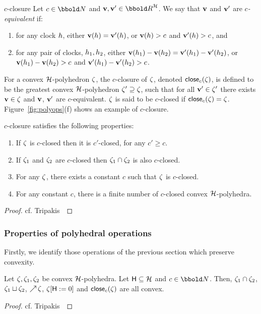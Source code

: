 {\begin{paragraph}{$c$-closure}
Let $c \in \nat$ and $\clkvl,\clkvl' \in \clkvls$. We say that
$\mathbf{v}$ and $\mathbf{v}'$ are \emph{$c$-equivalent} if:
\begin{enumerate}
\item for any clock $h$, either $\mathbf{v}(h) = \mathbf{v}'(h)$,
  or $\mathbf{v}(h) > c$ and $\mathbf{v}'(h) > c$, and
\item for any pair of clocks, $h_1, h_2$, either
  $\mathbf{v}(h_1) - \mathbf{v}(h_2) = \mathbf{v}'(h_1) - \mathbf{v}'(h_2)$, or $\mathbf{v}(h_1) - \mathbf{v}(h_2) > c$ and $\mathbf{v}'(h_1) - \mathbf{v}'(h_2) > c$. 
\end{enumerate}
For a convex $\clocks$-polyhedron ${\zeta}$, the
$c$-closure of ${\zeta}$, denoted ${\mathop{{\sf close}_{c}}({\zeta})}$, is defined to be the
greatest convex $\clocks$-polyhedron ${\zeta}' \supseteq {\zeta}$,
such that for all $\mathbf{v}' \in {\zeta}'$ there exists $\mathbf{v} \in {\zeta}$
and $\mathbf{v}$, $\mathbf{v}'$ are $c$-equivalent. ${\zeta}$ is said to be $c$-closed
if ${\mathop{{\sf close}_{c}}({\zeta})} = {\zeta}$. Figure~\ref{fig:polyops}(f) shows an
example of $c$-closure.
\begin{proposition}\label{prop:cclosure}
$c$-closure satisfies the following properties:
\begin{enumerate}
\item If ${\zeta}$ is $c$-closed then it is $c'$-closed, for any
  $c' \geq c$.
\item If ${\zeta}_1$ and ${\zeta}_2$ are $c$-closed then ${\zeta}_1 \cap
  {\zeta}_2$ is also $c$-closed.
\item For any ${\zeta}$, there exists a constant $c$ such that 
  ${\zeta}$ is $c$-closed.
\item For any constant $c$, there is a finite number of $c$-closed
  convex $\clocks$-polyhedra.
\end{enumerate}
\end{proposition}
\begin{proof}
cf. Tripakis~\cite{tri:98}
\end{proof}
\end{paragraph}

\subsubsection{Properties of polyhedral operations}
Firstly, we identify those operations of the previous section which
preserve convexity.
\begin{proposition}\label{prop:polyconvex}
Let ${\zeta}, {\zeta}_1, {\zeta}_2$ be convex $\clocks$-polyhedra.
Let $\someclks \subseteq \clocks$ and $c \in \nat$. Then, ${\zeta}_1
\cap {\zeta}_2$, ${\zeta}_1 \sqcup {\zeta}_2$,
$\mathop{\nearrow}{{\zeta}}$, ${\zeta}[{\sf H}:=0]$ and
${\mathop{{\sf close}_{c}}({\zeta})}$ are all convex.
\end{proposition}
\begin{proof}
cf. Tripakis~\cite{tri:98}
\end{proof}

}
